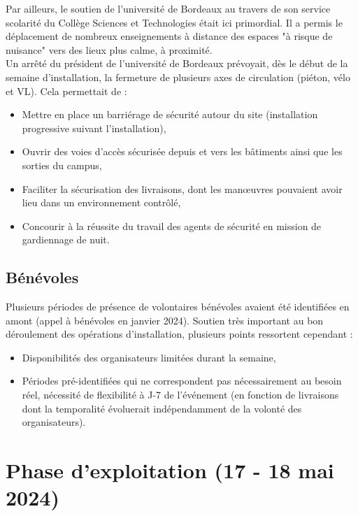 \documentclass[12pt,a4paper]{report}
\begin{document}
Par ailleurs, le soutien de l'université de Bordeaux au travers de son service scolarité du Collège Sciences et Technologies était ici primordial. Il a permis le déplacement de nombreux enseignements à distance des espaces "à risque de nuisance" vers des lieux plus calme, à proximité.\\

Un arrêté du président de l'université de Bordeaux prévoyait, dès le début de la semaine d'installation, la fermeture de plusieurs axes de circulation (piéton, vélo et VL). Cela permettait de :
\begin{itemize}
\item Mettre en place un barriérage de sécurité autour du site (installation progressive suivant l'installation),
\item Ouvrir des voies d'accès sécurisée depuis et vers les bâtiments ainsi que les sorties du campus,
\item Faciliter la sécurisation des livraisons, dont les manœuvres pouvaient avoir lieu dans un environnement contrôlé,
\item Concourir à la réussite du travail des agents de sécurité en mission de gardiennage de nuit.\\
\end{itemize}

\subsection{Bénévoles}

Plusieurs périodes de présence de volontaires bénévoles avaient été identifiées en amont (appel à bénévoles en janvier 2024). Soutien très important au bon déroulement des opérations d'installation, plusieurs points ressortent cependant : 
\begin{itemize}
\item Disponibilités des organisateurs limitées durant la semaine,
\item Périodes pré-identifiées qui ne correspondent pas nécessairement au besoin réel, nécessité de flexibilité à J-7 de l'événement (en fonction de livraisons dont la temporalité évoluerait indépendamment de la volonté des organisateurs).
\end{itemize}

\section{Phase d'exploitation (17 - 18 mai 2024)}
\end{document}
